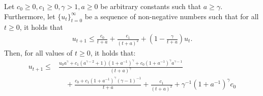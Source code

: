 \begin{lemma}\label{lemma:general_recurrence}
Let $c_0 \geq 0, c_1 \geq 0, \gamma > 1, a \geq 0$ be arbitrary constants such that $a \geq \gamma$.
Furthermore, let $\{u_t\}_{t=0}^\infty$ be a sequence of non-negative numbers such that for all $t \geq 0$, it holds that
\begin{align*}
    u_{t+1} \leq \frac{c_0}{t+a} + \frac{c_1}{(t+a)^2} + \left( 1 - \frac{\gamma}{t+a}\right) u_t.
\end{align*}
Then, for all values of $t\geq 0$, it holds that:
\begin{align*}
u_{t+1} \leq &\frac{u_0 a ^ \gamma + c_1 (a^{\gamma-2} + 1) (1+a^{-1})^\gamma + c_0 (1+a^{-1})^\gamma a^{\gamma-1}}{\left(t+a\right)^\gamma}  \\
    &\quad + \frac{c_0 + c_1 (1+a^{-1})^\gamma (\gamma - 1)^{-1}}{t+a} + \frac{c_1}{(t+a)^2} + \gamma^{-1}(1+a^{-1})^\gamma c_0 
\end{align*}
    
\end{lemma}
